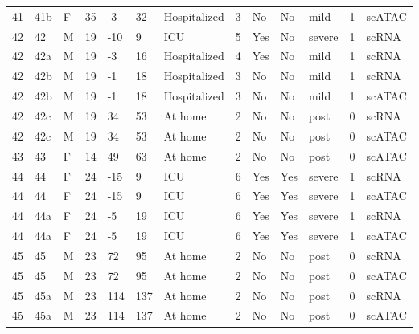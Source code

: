 \documentclass{book}
\begin{document}
\begin{refsection}
\begin{landscape}
\begin{longtable}{p{0.7cm}p{0.7cm}p{0.5cm}p{0.75cm}p{0.75cm}p{0.75cm}p{1.75cm}p{0.8cm}p{0.75cm}p{1cm}p{0.75cm}p{1cm}p{0.75cm}}
    41 & 41b & F & 35 & -3  & 32  & Hospitalized                                       & 3 & No  & No  & mild   & 1 & scATAC \\
    42 & 42  & M & 19 & -10 & 9   & ICU                                                & 5 & Yes & No  & severe & 1 & scRNA \\
    42 & 42a & M & 19 & -3  & 16  & Hospitalized                                       & 4 & Yes & No  & mild   & 1 & scRNA \\
    42 & 42b & M & 19 & -1  & 18  & Hospitalized                                       & 3 & No  & No  & mild   & 1 & scRNA \\
    42 & 42b & M & 19 & -1  & 18  & Hospitalized                                       & 3 & No  & No  & mild   & 1 & scATAC \\
    42 & 42c & M & 19 & 34  & 53  & At home                                            & 2 & No  & No  & post   & 0 & scRNA \\
    42 & 42c & M & 19 & 34  & 53  & At home                                            & 2 & No  & No  & post   & 0 & scATAC \\
    43 & 43  & F & 14 & 49  & 63  & At home                                            & 2 & No  & No  & post   & 0 & scATAC \\
    44 & 44  & F & 24 & -15 & 9   & ICU                                                & 6 & Yes & Yes & severe & 1 & scRNA \\
    44 & 44  & F & 24 & -15 & 9   & ICU                                                & 6 & Yes & Yes & severe & 1 & scATAC \\
    44 & 44a & F & 24 & -5  & 19  & ICU                                                & 6 & Yes & Yes & severe & 1 & scRNA \\
    44 & 44a & F & 24 & -5  & 19  & ICU                                                & 6 & Yes & Yes & severe & 1 & scATAC \\
    45 & 45  & M & 23 & 72  & 95  & At home                                            & 2 & No  & No  & post   & 0 & scRNA \\
    45 & 45  & M & 23 & 72  & 95  & At home                                            & 2 & No  & No  & post   & 0 & scATAC \\
    45 & 45a & M & 23 & 114 & 137 & At home                                            & 2 & No  & No  & post   & 0 & scRNA \\
    45 & 45a & M & 23 & 114 & 137 & At home                                            & 2 & No  & No  & post   & 0 & scATAC \\

\end{longtable}
\end{landscape}
\end{refsection}
\end{document}
